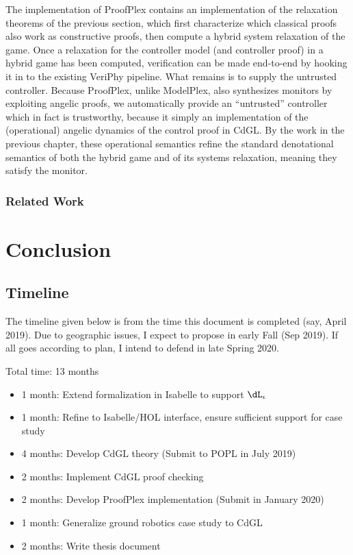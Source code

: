 \documentclass[12pt]{cmuthesis}
\theoremstyle{definition}
\theoremstyle{remark}
\newcommand{\CdGL}{\textsf{CdGL}\xspace}
\newcommand{\ProofPlex}{ProofPlex\xspace}
\newcommand{\Isabelle}{Isabelle/HOL\xspace}
\newcommand{\VeriPhy}{VeriPhy\xspace}
\newcommand{\ModelPlex}{ModelPlex\xspace}
\newcommand{\dLi}{\ensuremath{\dL_\iota}}
\begin{document}
The implementation of \ProofPlex contains an implementation of the relaxation theorems of the previous section, which first characterize which classical proofs also work as constructive proofs, then compute a hybrid system relaxation of the game.
Once a relaxation for the controller model (and controller proof) in a hybrid game has been computed, verification can be made end-to-end by hooking it in to the existing \VeriPhy pipeline.
What remains is to supply the untrusted controller.
Because \ProofPlex, unlike \ModelPlex, also synthesizes monitors by exploiting angelic proofs, we automatically provide an ``untrusted'' controller which in fact is trustworthy, because it simply an implementation of the (operational) angelic dynamics of the control proof in \CdGL. By the work in the previous chapter, these operational semantics refine the standard denotational semantics of both the hybrid game and of its systems relaxation, meaning they satisfy the monitor.

\subsection{Related Work}
\chapter{Conclusion} 
\section{Timeline}
The timeline given below is from the time this document is completed (say, April 2019).
Due to geographic issues, I expect to propose in early Fall (Sep 2019).
If all goes according to plan, I intend to defend in late Spring 2020.

Total time: 13 months
\begin{itemize}
\item 1 month: Extend \dL formalization in Isabelle to support \dLi
\item 1 month: Refine \KeYmaeraX to \Isabelle interface, ensure sufficient support for case study
\item 4 months: Develop \CdGL theory (Submit to POPL in July 2019)
\item 2 months: Implement \CdGL proof checking
\item 2 months: Develop \ProofPlex implementation (Submit in January 2020) 
\item 1 month: Generalize ground robotics case study to \CdGL
\item 2 months: Write thesis document
\end{itemize}
\end{document}
